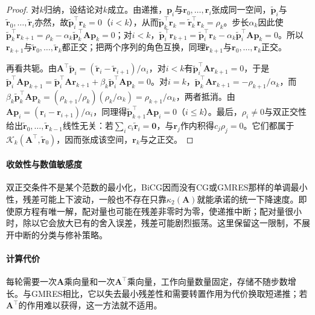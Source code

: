 \begin{proof}
对$k$归纳，设结论对$k$成立。由递推，$\bm p_i$与$\bm r_0,\ldots,\bm r_i$张成同一空间，$\widetilde{\bm p}_i$与$\widetilde{\bm r}_0,\ldots,\widetilde{\bm r}_i$亦然，故$\widetilde{\bm p}_i^\top\bm r_k=0$（$i<k$），从而$\widetilde{\bm p}_k^\top\bm r_k=\widetilde{\bm r}_k^\top\bm r_k=\rho_k$。步长$\alpha_k$因此使$\widetilde{\bm p}_k^\top\bm r_{k+1}=\rho_k-\alpha_k\widetilde{\bm p}_k^\top\bm A\bm p_k=0$；对$i<k$，$\widetilde{\bm p}_i^\top\bm r_{k+1}=\widetilde{\bm p}_i^\top\bm r_k-\alpha_k\widetilde{\bm p}_i^\top\bm A\bm p_k=0$。所以$\bm r_{k+1}$与$\widetilde{\bm r}_0,\ldots,\widetilde{\bm r}_k$都正交；把两个序列的角色互换，同理$\widetilde{\bm r}_{k+1}$与$\bm r_0,\ldots,\bm r_k$正交。

再看共轭。由$\bm A^\top\widetilde{\bm p}_i=(\widetilde{\bm r}_i-\widetilde{\bm r}_{i+1})/\alpha_i$，对$i<k$有$\widetilde{\bm p}_i^\top\bm A\bm r_{k+1}=0$，于是$\widetilde{\bm p}_i^\top\bm A\bm p_{k+1}=\widetilde{\bm p}_i^\top\bm A\bm r_{k+1}+\beta_k\widetilde{\bm p}_i^\top\bm A\bm p_k=0$。对$i=k$，$\widetilde{\bm p}_k^\top\bm A\bm r_{k+1}=-\rho_{k+1}/\alpha_k$，而$\beta_k\widetilde{\bm p}_k^\top\bm A\bm p_k=(\rho_{k+1}/\rho_k)(\rho_k/\alpha_k)=\rho_{k+1}/\alpha_k$，两者抵消。由$\bm A\bm p_i=(\bm r_i-\bm r_{i+1})/\alpha_i$，同理得$\widetilde{\bm p}_{k+1}^\top\bm A\bm p_i=0$（$i\le k$）。最后，$\rho_i\ne0$与双正交性给出$\widetilde{\bm r}_0,\ldots,\widetilde{\bm r}_{k-1}$线性无关：若$\sum_ic_i\widetilde{\bm r}_i=\bm 0$，与$\bm r_j$作内积得$c_j\rho_j=0$。它们都属于$\mathcal K_k(\bm A^\top,\widetilde{\bm r}_0)$，因而张成该空间，$\bm r_k$与之正交。
\end{proof}

\paragraph{收敛性与数值敏感度}
双正交条件不是某个范数的最小化，BiCG因而没有CG或GMRES那样的单调最小性，残差可能上下波动，一般也不存在只靠$\kappa_2(\bm A)$就能承诺的统一下降速度。即使原方程有唯一解，配对量也可能在残差非零时为零，使递推中断；配对量很小时，除以它会放大已有的舍入误差，残差可能剧烈振荡。这里保留这一限制，不展开中断的分类与修补策略。

\paragraph{计算代价}
每轮需要一次$\bm A$乘向量和一次$\bm A^\top$乘向量，工作向量数量固定，存储不随步数增长。与GMRES相比，它以失去最小残差性和需要转置作用为代价换取短递推；若$\bm A^\top$的作用难以获得，这一方法就不适用。

